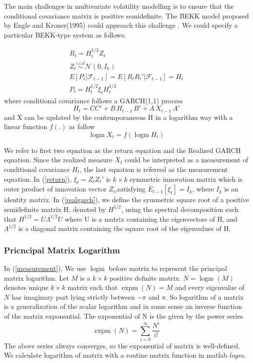 \documentclass[titlepage,11pt]{article}
\newcommand{\expm}{\operatorname{expm}}
\newcommand{\logm}{\operatorname{logm}}
\begin{document}
The main challenges in multivariate volatility modelling is to ensure that the conditional covariance matrix is positive semidefinite. The BEKK model proposed by Engle and Kroner(1995) could approach this challenge .
We could specify a particular BEKK-type system as follows:


\begin{align}
	\label{return}
	R_t = H_t^{1/2} Z_t \nonumber\\
	Z_t \overset{i.i.d} {\sim} \mathcal{N}(0,I_k) \nonumber\\
	E[P_t|\mathcal{F}_{t-1}]=E[R_t R_t'|\mathcal{F}_{t-1}]=H_t \nonumber\\
	P_t = H_t^{1/2}\xi_t H_t^{1/2}
\end{align}
where conditional covariance follows a GARCH(1,1) process
\begin{equation}
	\label{realgarch}
	 H_t=CC'+ B\,  H_{t-1} \,B'+A \,  X_{t-1} \, A'
\end{equation}
and X can be updated by the contemporaneous H in a logarithm way with a linear function $f(.)$ as follow 
\begin{equation}
	\label{measurement}
	 \logm X_t=f(\logm H_t)
\end{equation}

We refer to first two equation as the return equation and the Realized GARCH equation. Since the realized measure $X_t$ could be interpreted as a measurement of conditional covariance $H_t$, the last equation is referred as the measurement equation.
  In (\ref{return}), $\xi_t = Z_t Z_t'$ is $k \times k$ symmetric innovation matrix which is outer product of innovation vector $Z_t$,satisfying $E_{t-1}[\xi_t]=I_k$, where $I_k$ is an identity matrix. 
In (\ref{realgarch}), we define the symmetric square root of a positive semidefinite matrix H, denoted by $H^{1/2}$, using the spectral decomposition such that $H^{1/2} = U \Lambda^{1/2} U$ where U is a matrix containing the eigenvectors of H, and $\Lambda^{1/2}$ is a diagonal matrix containing the square root of the eigenvalues of H. 
\subsubsection{Pricncipal Matrix Logarithm}
In (\ref{measurement}), We use $\logm$ before matrix to represent the principal matrix logarithm. Let $M$ is a $k \times k$ positive definite matrix. $N = \logm(M)$ denotes unique $k \times k$ matrix such that $\expm(N) = M$ and  every eigenvalue of $N$ has imaginary part lying strictly between ${-\pi}$ and $\pi$. So logarithm of a matrix is a generalization of the scalar logarithm and in some sense an inverse function of the matrix exponential. The exponential of N is the given by the power series
\begin{equation*}
\expm(N) = \sum_{i=0}^{\infty} \frac{N^i}{i!}
\end{equation*}
The above series always converges, so the exponential of matrix is well-defined. We calculate logarithm of matrix with a routine matrix function in matlab $logm$.
 
\end{document}
